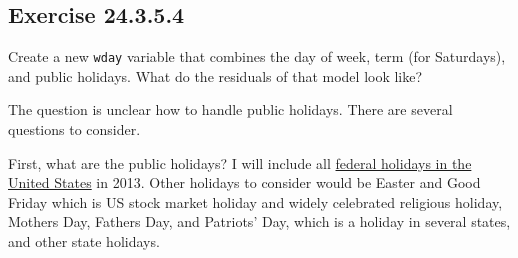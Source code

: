 \documentclass[]{book}
\newenvironment{Shaded}{\begin{snugshade}}{\end{snugshade}}
\newcommand{\DataTypeTok}[1]{\textcolor[rgb]{0.13,0.29,0.53}{#1}}
\newcommand{\DecValTok}[1]{\textcolor[rgb]{0.00,0.00,0.81}{#1}}
\newcommand{\KeywordTok}[1]{\textcolor[rgb]{0.13,0.29,0.53}{\textbf{#1}}}
\newcommand{\NormalTok}[1]{#1}
\newcommand{\OperatorTok}[1]{\textcolor[rgb]{0.81,0.36,0.00}{\textbf{#1}}}
\newcommand{\StringTok}[1]{\textcolor[rgb]{0.31,0.60,0.02}{#1}}
\theoremstyle{plain}
\theoremstyle{remark}
\begin{document}
\hypertarget{exercise-24.3.5.4}{%
\subsection*{\texorpdfstring{Exercise {24.3.5.4}}{Exercise 24.3.5.4}}\label{exercise-24.3.5.4}}

Create a new \texttt{wday} variable that combines the day of week, term (for Saturdays), and public holidays. What do the residuals of that model look like?

The question is unclear how to handle public holidays. There are several questions to consider.

First, what are the public holidays? I will include all \href{https://en.wikipedia.org/wiki/Federal_holidays_in_the_United_States}{federal holidays in the United States} in 2013.
Other holidays to consider would be Easter and Good Friday which is US stock market holiday and widely celebrated religious holiday, Mothers Day, Fathers Day,
and Patriots' Day, which is a holiday in several states, and other state holidays.

\begin{Shaded}
\end{Shaded}
\end{document}
